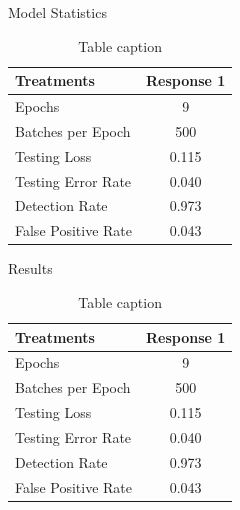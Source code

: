 \documentclass[final]{beamer}
\newlength{\onecolwid}
\begin{document}
\begin{frame}{}
\begin{columns}[t]
\begin{column}{\onecolwid} %
	\begin{block}{Model Statistics}
		\begin{table}
			\vspace{2ex}
			\begin{tabular}{|l c|}
				\toprule
				\textbf{Treatments} & \textbf{Response 1} \\
				\midrule
				Epochs & 9  \\
				Batches per Epoch & 500\\
				Testing Loss &  0.115 \\
				Testing Error Rate & 0.040 \\
				Detection Rate & 0.973\\
				False Positive Rate& 0.043\\
				\bottomrule
			\end{tabular}
			\caption{Table caption}
		\end{table}
		
	\end{block}
\begin{block}{Results}
	\begin{table}
		\vspace{2ex}
		\begin{tabular}{|l c|}
			\toprule
			\textbf{Treatments} & \textbf{Response 1} \\
			\midrule
			Epochs & 9  \\
			Batches per Epoch & 500\\
			Testing Loss &  0.115 \\
			Testing Error Rate & 0.040 \\
			Detection Rate & 0.973\\
			False Positive Rate& 0.043\\
			\bottomrule
		\end{tabular}
		\caption{Table caption}
	\end{table}
	

\end{block}
\end{column}
\end{columns}
\end{frame}
\end{document}
